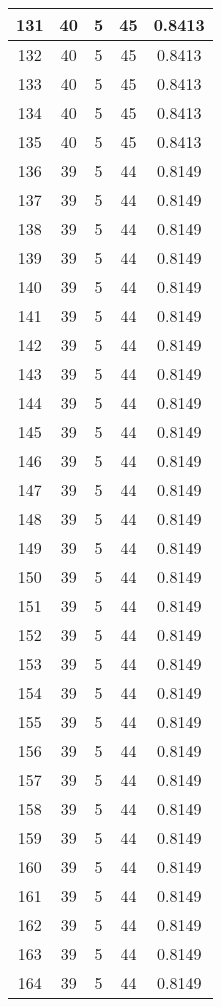 \documentclass[letterpaper, 12pt]{article}
\begin{document}
\begin{longtable}{|c|c|c|c|c|}
\hline
131 & 40 & 5 & 45 & 0.8413 \\
\hline
132 & 40 & 5 & 45 & 0.8413 \\
\hline
133 & 40 & 5 & 45 & 0.8413 \\
\hline
134 & 40 & 5 & 45 & 0.8413 \\
\hline
135 & 40 & 5 & 45 & 0.8413 \\
\hline
136 & 39 & 5 & 44 & 0.8149 \\
\hline
137 & 39 & 5 & 44 & 0.8149 \\
\hline
138 & 39 & 5 & 44 & 0.8149 \\
\hline
139 & 39 & 5 & 44 & 0.8149 \\
\hline
140 & 39 & 5 & 44 & 0.8149 \\
\hline
141 & 39 & 5 & 44 & 0.8149 \\
\hline
142 & 39 & 5 & 44 & 0.8149 \\
\hline
143 & 39 & 5 & 44 & 0.8149 \\
\hline
144 & 39 & 5 & 44 & 0.8149 \\
\hline
145 & 39 & 5 & 44 & 0.8149 \\
\hline
146 & 39 & 5 & 44 & 0.8149 \\
\hline
147 & 39 & 5 & 44 & 0.8149 \\
\hline
148 & 39 & 5 & 44 & 0.8149 \\
\hline
149 & 39 & 5 & 44 & 0.8149 \\
\hline
150 & 39 & 5 & 44 & 0.8149 \\
\hline
151 & 39 & 5 & 44 & 0.8149 \\
\hline
152 & 39 & 5 & 44 & 0.8149 \\
\hline
153 & 39 & 5 & 44 & 0.8149 \\
\hline
154 & 39 & 5 & 44 & 0.8149 \\
\hline
155 & 39 & 5 & 44 & 0.8149 \\
\hline
156 & 39 & 5 & 44 & 0.8149 \\
\hline
157 & 39 & 5 & 44 & 0.8149 \\
\hline
158 & 39 & 5 & 44 & 0.8149 \\
\hline
159 & 39 & 5 & 44 & 0.8149 \\
\hline
160 & 39 & 5 & 44 & 0.8149 \\
\hline
161 & 39 & 5 & 44 & 0.8149 \\
\hline
162 & 39 & 5 & 44 & 0.8149 \\
\hline
163 & 39 & 5 & 44 & 0.8149 \\
\hline
164 & 39 & 5 & 44 & 0.8149 \\

\end{longtable}
\end{document}

